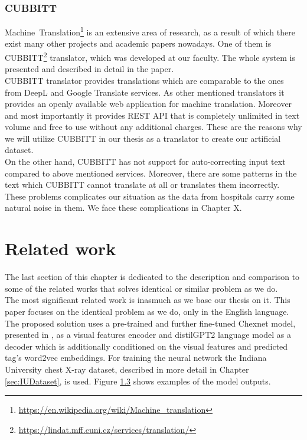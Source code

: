 \subsubsection{CUBBITT}
Machine~Translation\footnote[4]{\url{https://en.wikipedia.org/wiki/Machine\_translation}} is an extensive area of research, as a result of which there exist many other projects and academic papers nowadays. One of them is CUBBITT\footnote[5]{\url{https://lindat.mff.cuni.cz/services/translation/}} translator, which was developed at our faculty. The whole system is presented and described in detail in the \citet{biblio:PoToTransformingmachine2020} paper. \\

CUBBITT translator provides translations which are comparable to the ones from DeepL and Google Translate services. As other mentioned translators it provides an openly available web application for machine translation. Moreover and most importantly it provides REST API that is completely unlimited in text volume and free to use without any additional charges. These are the reasons why we will utilize CUBBITT in our thesis as a translator to create our artificial dataset.\\

On the other hand, CUBBITT has not support for auto-correcting input text compared to above mentioned services. Moreover, there are some patterns in the text which CUBBITT cannot translate at all or translates them incorrectly. These problems complicates our situation as the data from hospitals carry some natural noise in them. We face these complications in Chapter X.

\section{Related work}
The last section of this chapter is dedicated to the description and comparison to some of the related works that solves identical or similar problem as we do.\\

The most significant related work is \citet{alfarghaly2021automated} inasmuch as we base our thesis on it. This paper focuses on the identical problem as we do, only in the English language. The proposed solution uses a pre-trained and further fine-tuned Chexnet model, presented in \citet{rajpurkar2017chexnet}, as a visual features encoder and distilGPT2 language model\citep{radford2019language} as a decoder which is additionally conditioned on the visual features and predicted tag's word2vec\citep{mikolov2013distributed} embeddings. For training the neural network the Indiana University chest X-ray dataset, described in more detail in Chapter \ref{sec:IUDataset}, is used. Figure \hyperref[fig03:OmarExample]{1.3} shows examples of the model outputs.\\

